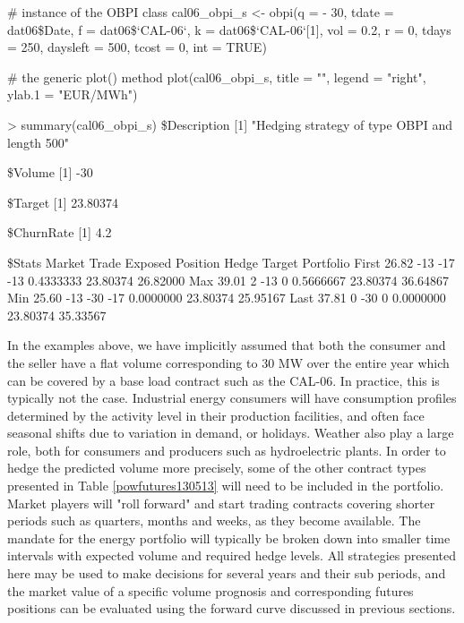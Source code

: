 \newpage

\begin{example*}
# instance of the OBPI class
cal06_obpi_s <- obpi(q = - 30,
\hspace{3cm} tdate = dat06\$Date,
\hspace{3cm} f = dat06\$`CAL-06`,
\hspace{3cm} k = dat06\$`CAL-06`[1],
\hspace{3cm} vol = 0.2,
\hspace{3cm} r = 0,
\hspace{3cm} tdays = 250,
\hspace{3cm} daysleft = 500,
\hspace{3cm} tcost = 0,
\hspace{3cm} int = TRUE)

# the generic plot() method
plot(cal06_obpi_s, title = "", legend = "right", ylab.1 = "EUR/MWh")
\end{example*}




\begin{example*}
> summary(cal06_obpi_s)
\$Description
[1] "Hedging strategy of type OBPI and length 500"

\$Volume
[1] -30

\$Target
[1] 23.80374

\$ChurnRate
[1] 4.2

\$Stats
      Market Trade Exposed Position     Hedge   Target Portfolio
First  26.82   -13     -17      -13 0.4333333 23.80374  26.82000
Max    39.01     2     -13        0 0.5666667 23.80374  36.64867
Min    25.60   -13     -30      -17 0.0000000 23.80374  25.95167
Last   37.81     0     -30        0 0.0000000 23.80374  35.33567
\end{example*}




In the examples above, we have implicitly assumed that both the consumer and the seller have a flat volume corresponding to 30 MW over the entire year which can be covered by a base load contract such as the CAL-06. In practice, this is typically not the case. Industrial energy consumers will have consumption profiles determined by the activity level in their production facilities, and often face seasonal shifts due to variation in demand, or holidays. Weather also play a large role, both for consumers and producers such as hydroelectric plants. In order to hedge the predicted volume more precisely, some of the other contract types presented in Table \ref{powfutures130513} will need to be included in the portfolio. Market players will "roll forward" and start trading contracts covering shorter periods such as quarters, months and weeks, as they become available. The mandate for the energy portfolio will typically be broken down into smaller time intervals with expected volume and required hedge levels. All strategies presented here may be used to make decisions for several years and their sub periods, and the market value of a specific volume prognosis and corresponding futures positions can be evaluated using the forward curve discussed in previous sections.

